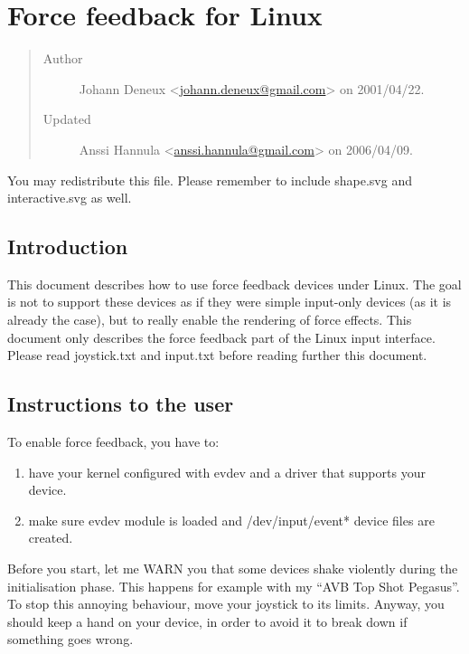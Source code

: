 \documentclass[a4paper,8pt,english]{sphinxmanual}
\begin{document}
\section{Force feedback for Linux}
\label{input/ff:force-feedback-for-linux}\label{input/ff::doc}\begin{quote}\begin{description}
\item[{Author}] \leavevmode
Johann Deneux \textless{}\href{mailto:johann.deneux@gmail.com}{johann.deneux@gmail.com}\textgreater{} on 2001/04/22.

\item[{Updated}] \leavevmode
Anssi Hannula \textless{}\href{mailto:anssi.hannula@gmail.com}{anssi.hannula@gmail.com}\textgreater{} on 2006/04/09.

\end{description}\end{quote}

You may redistribute this file. Please remember to include shape.svg and
interactive.svg as well.


\subsection{Introduction}
\label{input/ff:introduction}
This document describes how to use force feedback devices under Linux. The
goal is not to support these devices as if they were simple input-only devices
(as it is already the case), but to really enable the rendering of force
effects.
This document only describes the force feedback part of the Linux input
interface. Please read joystick.txt and input.txt before reading further this
document.


\subsection{Instructions to the user}
\label{input/ff:instructions-to-the-user}
To enable force feedback, you have to:
\begin{enumerate}
\item {} 
have your kernel configured with evdev and a driver that supports your
device.

\item {} 
make sure evdev module is loaded and /dev/input/event* device files are
created.

\end{enumerate}

Before you start, let me WARN you that some devices shake violently during the
initialisation phase. This happens for example with my ``AVB Top Shot Pegasus''.
To stop this annoying behaviour, move your joystick to its limits. Anyway, you
should keep a hand on your device, in order to avoid it to break down if
something goes wrong.
\end{document}
